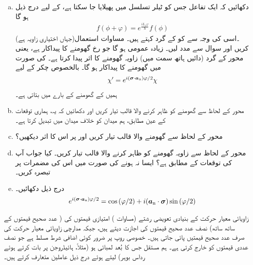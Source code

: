 \begin{enumerate}[a.]
\item
 دکھائیں کہ ایک تفاعل  جس کو ٹیلر تسلسل میں پھیلایا جا سکتا ہے، کے لیے درج ذیل ہو گا 
\begin{align*}
 f(\phi+\varphi)= e^{\frac{i L_z\varphi}{\hslash}}f(\phi)
\end{align*} 
(جہاں  اختیاری زاویہ ہے)۔اسی کی وجہ سے  کو  کے گرد  کہتے ہیں۔ مساوات  استعمال کریں اور سوال  سے مدد لیں۔ زیادہ عمومی  ہو گا جو  رخ گھومنے کا پیداکار ہے، 
 یعنی  محور  کے گرد (دائیں ہاتھ سمت میں) زاویہ  گھومنے کا اثر پیدا کرتا ہے۔  کی صورت میں گھومنے کا پیداکار  ہو گا۔ بالخصوص  چکر کے لیے
\begin{align}
 \chi'=e^{i({{\boldsymbol{\sigma}}}\cdot {\ensuremath{{\boldsymbol{a}}}_{\textup{n}}})\varphi/2}\chi
\end{align}
 ہمیں  کے گھومنے کے بارے میں بتاتی ہے۔ 
\item
 محور  کے لحاظ سے گھومنے کو ظاہر کرنے والا  قالب تیار کریں اور دکھائیں کہ یہ، ہماری توقعات کے عین مطابق، ہم میدان  کو خلاف میدان  میں تبدیل کرتا ہے۔ 
\item
 محور  کے لحاظ سے گھومنے والا قالب تیار کریں اور  پر اس کا اثر دیکھیں؟ 
\item
 محور  کے لحاظ سے  زاویہ گھومنے کو ظاہر کرنے والا قالب تیار کریں۔ کیا جواب آپ کی توقعات کے مطابق ہے؟ ایسا نہ ہونے کی صورت میں اس کی مضمرات پر تبصرہ کریں۔
\item
 درج ذیل دکھائیں۔
\begin{align} e^{i({{\boldsymbol{\sigma}}}\cdot {\ensuremath{{\boldsymbol{a}}}_{\textup{n}}})\varphi/2}=\cos{(\varphi/2)}+i({{\boldsymbol{a}}_{\textup{n}}}\cdot {\ensuremath{{\boldsymbol{\sigma}}}})\sin{(\varphi/2)}
\end{align}
\end{enumerate}
زاویائی معیار حرکت کے بنیادی  تعویضی  رشتے (مساوات ) امتیازی  قیمتوں  کی ( عدد صحیح قیمتوں کے ساتھ ساتھ) نصف عدد صحیح قیمتوں کی اجازت دیتے ہیں، جبکہ مدارچی زاویائی معیار حرکت کی صرف عدد صحیح قیمتیں پائی جاتی ہیں۔ خصوصی روپ  پر ضرور کوئی اضافی شرط مسلط ہے جو نصف عددی قیمتوں کو خارج کرتی ہے۔ ہم مستقل  جس کا بُعد لمبائی ہو (مثلاً، ہائیڈروجن پر بات کرتے ہوئے رداس بوہر) لیتے ہوئے درج ذیل عاملین متعارف کرتے ہیں۔

